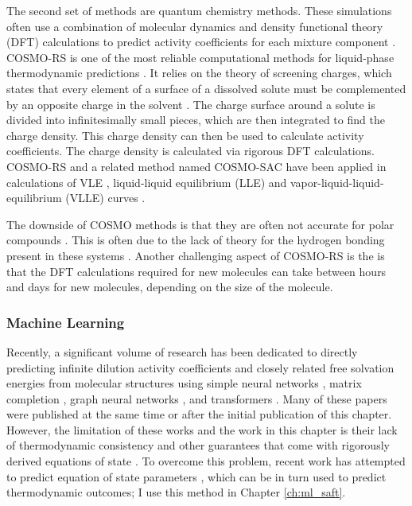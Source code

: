 The second set of methods are quantum chemistry methods. These simulations often use a combination of molecular dynamics and density functional theory (DFT) calculations to predict activity coefficients for each mixture component \cite{Constantinescu2005}. COSMO-RS is one of the most reliable computational methods for liquid-phase thermodynamic predictions \cite{Klamt1995, Klamt2010}. It relies on the theory of screening charges, which states that every element of a surface of a dissolved solute must be complemented by an opposite charge in the solvent  \cite{Klamt1995}. The charge surface around a solute is divided into infinitesimally small pieces, which are then integrated to find the charge density. This charge density can then be used to calculate activity coefficients. The charge density is calculated via rigorous DFT calculations. COSMO-RS and a related method named COSMO-SAC have been applied in calculations of VLE \cite{Constantinescu2005}, liquid-liquid equilibrium (LLE) \cite{Dechambre2014} and vapor-liquid-liquid-equilibrium (VLLE) curves \cite{Kundu2011}.

The downside of COSMO methods is that they are often not accurate for polar compounds \cite{Constantinescu2005, Kundu2011}. This is often due to the lack of theory for the hydrogen bonding present in these systems \cite{Kundu2011}. Another challenging aspect of COSMO-RS is the is that the DFT calculations required for new molecules can take between hours and days for new molecules, depending on the size of the molecule.

\subsubsection{Machine Learning}

Recently, a significant volume of research has been dedicated to directly predicting infinite dilution activity coefficients and closely related free solvation energies from molecular structures using simple neural networks \cite{Urata2002, RamirezBeltran2009, Nami2011, Behrooz2017}, matrix completion \cite{Jirasek2020}, graph neural networks \cite{Grambow_2019, Vermeire2021, Chung2022, SanchezMedina2023a, Qin2023, Rittig2023, SanchezMedina2023b}, and transformers \cite{Winter2022, Winter2023}. Many of these papers were published at the same time or after the initial publication of this chapter. However, the limitation of these works and the work in this chapter is their lack of thermodynamic consistency and other guarantees that come with rigorously derived equations of state \cite{Rittig2023b}. To overcome this problem, recent work has attempted to predict equation of state parameters \cite{Abbasi2020, Madani2021, Abdallahelhadj2022, Winter2023, SanchezMedina2023b}, which can be in turn used to predict thermodynamic outcomes; I use this method in Chapter \ref{ch:ml_saft}.

